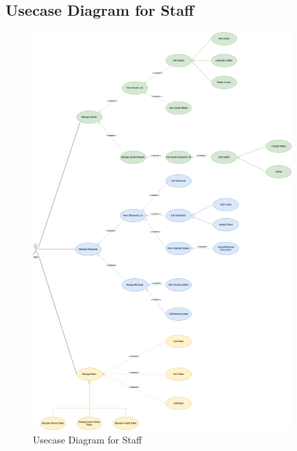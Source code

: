 \subsection{Usecase Diagram for Staff}
\begin{figure}[H]
    \centering
    \includegraphics[width=10cm]{graphics/usecase/freight-flex-UC-Staff.png}
    \caption{Usecase Diagram for Staff}
    \label{fig:Usecase Diagram for Staff}
\end{figure}

